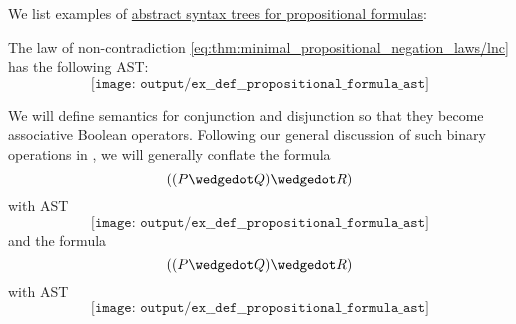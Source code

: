 \begin{example}\label{ex:def:propositional_fomula_ast}
  We list examples of \hyperref[def:propositional_fomula_ast]{abstract syntax trees for propositional formulas}:
  \begin{thmenum}
     The law of non-contradiction \eqref{eq:thm:minimal_propositional_negation_laws/lnc} has the following AST:
    \begin{equation*}
      \texttt{[image: output/ex\_\_def\_\_propositional\_formula\_ast]}
    \end{equation*}

     We will define semantics for conjunction and disjunction so that they become associative Boolean operators. Following our general discussion of such binary operations in , we will generally conflate the formula
    \begin{equation*}
      ((P \synwedge Q) \synwedge R)
    \end{equation*}
    with AST
    \begin{equation*}
      \texttt{[image: output/ex\_\_def\_\_propositional\_formula\_ast]}
    \end{equation*}
    and the formula
    \begin{equation*}
      ((P \synwedge Q) \synwedge R)
    \end{equation*}
    with AST
    \begin{equation*}
      \texttt{[image: output/ex\_\_def\_\_propositional\_formula\_ast]}
    \end{equation*}
  \end{thmenum}
\end{example}

